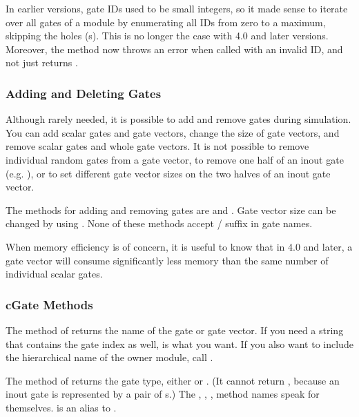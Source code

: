 \begin{note}
    In earlier {\opp} versions, gate IDs used to be small integers, so
    it made sense to iterate over all gates of a module by enumerating
    all IDs from zero to a maximum, skipping the holes (s).
    This is no longer the case with {\opp} 4.0 and later versions.
    Moreover, the  method now throws an error when called
    with an invalid ID, and not just returns .
\end{note}


\subsubsection{Adding and Deleting Gates}

Although rarely needed, it is possible to add and remove gates during
simulation. You can add scalar gates and gate vectors, change the size of
gate vectors, and remove scalar gates and whole gate vectors.
It is not possible to remove individual random gates from a gate vector,
to remove one half of an inout gate (e.g. ), or to set
different gate vector sizes on the two halves of an inout gate vector.

The  methods for adding and removing gates are
 and .
Gate vector size can be changed by using .
None of these methods accept  /  suffix in gate names.

\begin{note}
    When memory efficiency is of concern, it is useful to know that
    in {\opp} 4.0 and later, a gate vector will consume significantly less
    memory than the same number of individual scalar gates.
\end{note}


\subsubsection{cGate Methods}

The  method of  returns the name of the
gate or gate vector. If you need a string that contains the gate index
as well,  is what you want. If you also want to
include the hierarchical name of the owner module, call .

The  method of  returns the gate type,
either  or . (It cannot return
, because an inout gate is represented by a pair
of s.) The , ,
,  method names speak for themselves.
 is an alias to .

